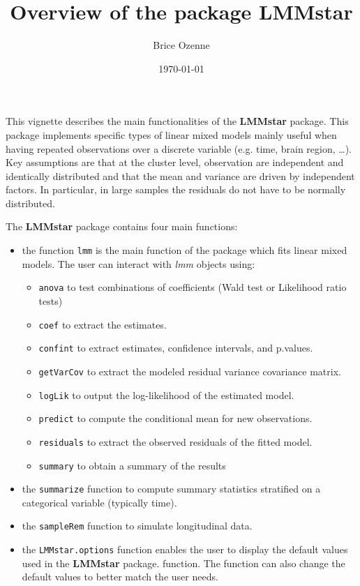 \documentclass[12pt]{article}
\author{Brice Ozenne}
\date{\today}
\title{Overview of the package LMMstar}
\begin{document}
\maketitle
This vignette describes the main functionalities of the \textbf{LMMstar}
package. This package implements specific types of linear mixed models
mainly useful when having repeated observations over a discrete
variable (e.g. time, brain region, \ldots{}). Key assumptions are that at
the cluster level, observation are independent and identically
distributed and that the mean and variance are driven by independent
factors. In particular, in large samples the residuals do not have to
be normally distributed.

\bigskip

The \textbf{LMMstar} package contains four main functions:
\begin{itemize}
\item the function \texttt{lmm} is the main function of the package which fits
linear mixed models. The user can interact with \emph{lmm} objects using:
\begin{itemize}
\item \texttt{anova} to test combinations of coefficients (Wald test or Likelihood ratio tests)
\item \texttt{coef} to extract the estimates.
\item \texttt{confint} to extract estimates, confidence intervals, and p.values.
\item \texttt{getVarCov} to extract the modeled residual variance covariance matrix.
\item \texttt{logLik} to output the log-likelihood of the estimated model.
\item \texttt{predict} to compute the conditional mean for new observations.
\item \texttt{residuals} to extract the observed residuals of the fitted model.
\item \texttt{summary} to obtain a summary of the results
\end{itemize}
\item the \texttt{summarize} function to compute summary statistics stratified on a categorical variable (typically time).
\item the \texttt{sampleRem} function to simulate longitudinal data.
\item the \texttt{LMMstar.options} function enables the user to display the
default values used in the \textbf{LMMstar} package. function. The function
can also change the default values to better match the user needs.
\end{itemize}
\end{document}
